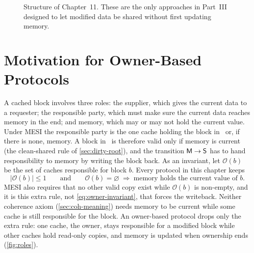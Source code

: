 \begin{figure}[htbp]
\centering
{}
\caption[]{Structure of Chapter~11. These are the only
approaches in Part~III designed to let modified data be shared without first
updating memory.}
\label{fig:ch11-map}
\end{figure}

\section{Motivation for Owner-Based Protocols}
\label{sec:own-motivation}
%

A cached block involves three roles: the supplier, which gives the current data
to a requester; the responsible party, which must make sure the current data
reaches memory in the end; and memory, which may or may not hold the current
value. Under MESI the responsible party is the one cache holding the block in
\stM\ or, if there is none, memory. A block in \stS\ is therefore valid only if
memory is current (the clean-shared rule of \cref{sec:dirty-root}), and the
transition $\textsf{M}\to\textsf{S}$ has to hand responsibility to memory by writing the block
back. As an invariant, let $\mathcal{O}(b)$ be the set of caches responsible for
block $b$. Every protocol in this chapter keeps
\begin{equation}
  |\mathcal{O}(b)| \le 1
  \qquad\text{and}\qquad
  \mathcal{O}(b) = \varnothing \;\Rightarrow\; \text{memory holds the current value of } b.
  \label{eq:owner-invariant}
\end{equation}
MESI also requires that no other valid copy exist while $\mathcal{O}(b)$ is
non-empty, and it is this extra rule, not \cref{eq:owner-invariant}, that forces
the writeback. Neither coherence axiom (\cref{sec:coh-meaning}) needs memory to be
current while some cache is still responsible for the block. An owner-based
protocol drops only the extra rule: one cache, the \gls{owner}, stays responsible
for a modified block while other caches hold read-only copies, and memory is
updated when ownership ends (\cref{fig:roles}).

